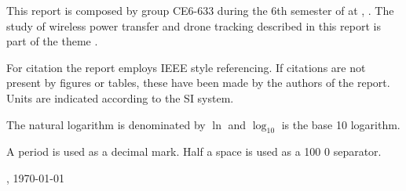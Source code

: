 
This report is composed by group CE6-633 during the 6th semester of \projectFaculty{} at \AAU{}, \the\year. The study of wireless power transfer and drone tracking described in this report is part of the theme \textit{\projectTheme}. 

For citation the report employs IEEE style referencing. If citations are not present by figures or tables, these have been made by the authors of the report. Units are indicated according to the SI system.

The natural logarithm is denominated by $\ln$ and $\log_{10}$ is the base 10 logarithm.

A period is used as a decimal mark. Half a space is used as a 100 0 separator. 

\vspace{\baselineskip}\hfill \AAU, \today
\vfill\noindent


